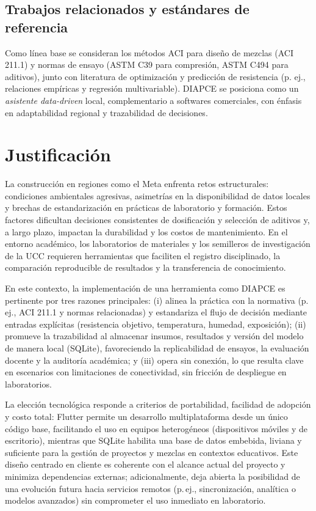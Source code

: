 \documentclass[12pt, letterpaper]{article}
\begin{document}
\subsection{Trabajos relacionados y estándares de referencia}
Como línea base se consideran los métodos ACI para diseño de mezclas (ACI 211.1) y normas de ensayo (ASTM C39 para compresión, ASTM C494 para aditivos), junto con literatura de optimización y predicción de resistencia (p. ej., relaciones empíricas y regresión multivariable). DIAPCE se posiciona como un \textit{asistente data-driven} local, complementario a softwares comerciales, con énfasis en adaptabilidad regional y trazabilidad de decisiones.




\section{Justificación}

La construcción en regiones como el Meta enfrenta retos estructurales: condiciones ambientales agresivas, asimetrías en la disponibilidad de datos locales y brechas de estandarización en prácticas de laboratorio y formación. Estos factores dificultan decisiones consistentes de dosificación y selección de aditivos y, a largo plazo, impactan la durabilidad y los costos de mantenimiento. En el entorno académico, los laboratorios de materiales y los semilleros de investigación de la UCC requieren herramientas que faciliten el registro disciplinado, la comparación reproducible de resultados y la transferencia de conocimiento.

En este contexto, la implementación de una herramienta como DIAPCE es pertinente por tres razones principales: (i) alinea la práctica con la normativa (p.\,ej., ACI 211.1 y normas relacionadas) y estandariza el flujo de decisión mediante entradas explícitas (resistencia objetivo, temperatura, humedad, exposición); (ii) promueve la trazabilidad al almacenar insumos, resultados y versión del modelo de manera local (SQLite), favoreciendo la replicabilidad de ensayos, la evaluación docente y la auditoría académica; y (iii) opera sin conexión, lo que resulta clave en escenarios con limitaciones de conectividad, sin fricción de despliegue en laboratorios.

La elección tecnológica responde a criterios de portabilidad, facilidad de adopción y costo total: Flutter permite un desarrollo multiplataforma desde un único código base, facilitando el uso en equipos heterogéneos (dispositivos móviles y de escritorio), mientras que SQLite habilita una base de datos embebida, liviana y suficiente para la gestión de proyectos y mezclas en contextos educativos. Este diseño centrado en cliente es coherente con el alcance actual del proyecto y minimiza dependencias externas; adicionalmente, deja abierta la posibilidad de una evolución futura hacia servicios remotos (p.\,ej., sincronización, analítica o modelos avanzados) sin comprometer el uso inmediato en laboratorio.
\end{document}
